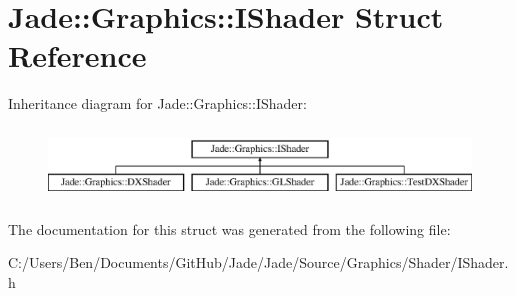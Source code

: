 \hypertarget{struct_jade_1_1_graphics_1_1_i_shader}{}\section{Jade\+:\+:Graphics\+:\+:I\+Shader Struct Reference}
\label{struct_jade_1_1_graphics_1_1_i_shader}
Inheritance diagram for Jade\+:\+:Graphics\+:\+:I\+Shader\+:\begin{figure}[H]
\begin{center}
\leavevmode
\includegraphics[height=1.934370cm]{struct_jade_1_1_graphics_1_1_i_shader}
\end{center}
\end{figure}


The documentation for this struct was generated from the following file\+:\begin{DoxyCompactItemize}
\item 
C\+:/\+Users/\+Ben/\+Documents/\+Git\+Hub/\+Jade/\+Jade/\+Source/\+Graphics/\+Shader/I\+Shader.\+h\end{DoxyCompactItemize}
